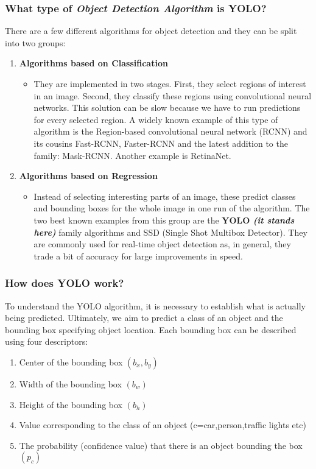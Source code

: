 \documentclass[a4paper]{article}
\begin{document}
\subsubsection{What type of \textit{Object Detection Algorithm} is YOLO?}
There are a few different algorithms for object detection and they can be split into two groups:
\begin{enumerate}
    \item \textbf{Algorithms based on Classification}
          \begin{itemize}[label={}]
              \item They are implemented in two stages. First, they select regions of interest in an image. Second, they classify these regions using convolutional neural networks. This solution can be slow because we have to run predictions for every selected region. A widely known example of this type of algorithm is the Region-based convolutional neural network (RCNN) and its cousins Fast-RCNN, Faster-RCNN and the latest addition to the family: Mask-RCNN. Another example is RetinaNet.
          \end{itemize}

    \item \textbf{Algorithms based on Regression}
          \begin{itemize}[label={}]
              \item Instead of selecting interesting parts of an image, these predict classes and bounding boxes for the whole image in one run of the algorithm. The two best known examples from this group are the \textbf{YOLO \textit{(it stands here)}} family algorithms and SSD (Single Shot Multibox Detector). They are commonly used for real-time object detection as, in general, they trade a bit of accuracy for large improvements in speed.
          \end{itemize}
\end{enumerate}

\subsubsection{How does YOLO work?\cite{appsilon_2020}}
To understand the YOLO algorithm, it is necessary to establish what is actually being predicted. Ultimately, we aim to predict a class of an object and the bounding box specifying object location. Each bounding box can be described using four descriptors:

\begin{enumerate}
    \item Center of the bounding box $(b_x,b_y)$
    \item Width of the bounding box $(b_w)$
    \item Height of the bounding box $(b_h)$
    \item Value corresponding to the class of an object (c=car,person,traffic lights etc)
    \item The probability (confidence value) that there is an object bounding the box $(p_c)$
\end{enumerate}
\end{document}
